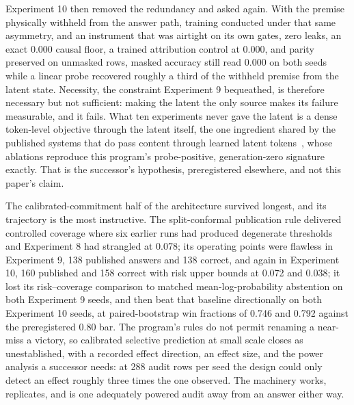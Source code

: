 \documentclass[10pt,a4paper]{article}
\begin{document}
Experiment 10 then removed the redundancy and asked again. With the premise
physically withheld from the answer path, training conducted under that same
asymmetry, and an instrument that was airtight on its own gates, zero leaks,
an exact 0.000 causal floor, a trained attribution control at 0.000, and
parity preserved on unmasked rows, masked accuracy still read 0.000 on both
seeds while a linear probe recovered roughly a third of the withheld premise
from the latent state. Necessity, the constraint Experiment 9 bequeathed, is
therefore necessary but not sufficient: making the latent the only source
makes its failure measurable, and it fails. What ten experiments never gave the
latent is a dense token-level objective through the latent itself, the one
ingredient shared by the published systems that do pass content through
learned latent tokens~\cite{codi2025,coconut2024}, whose ablations reproduce
this program's probe-positive, generation-zero signature exactly. That is
the successor's hypothesis, preregistered elsewhere, and not this paper's
claim.

The calibrated-commitment half of the architecture survived longest, and its
trajectory is the most instructive. The split-conformal publication rule
delivered controlled coverage where six earlier runs had produced degenerate
thresholds and Experiment 8 had strangled at 0.078; its operating points were
flawless in Experiment 9, 138 published answers and 138 correct, and again in
Experiment 10, 160 published and 158 correct with risk upper bounds at 0.072 and
0.038; it lost its risk--coverage comparison to matched mean-log-probability
abstention on both Experiment 9 seeds, and then beat that baseline directionally
on both Experiment 10 seeds, at paired-bootstrap win fractions of 0.746 and 0.792
against the preregistered 0.80 bar. The program's rules do not permit
renaming a near-miss a victory, so calibrated selective prediction at small
scale closes as unestablished, with a recorded effect direction, an effect
size, and the power analysis a successor needs: at 288 audit rows per seed
the design could only detect an effect roughly three times the one observed.
The machinery works, replicates, and is one adequately powered audit away
from an answer either way.
\end{document}

